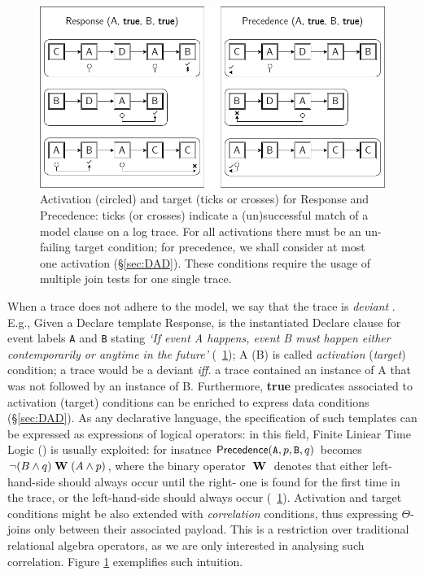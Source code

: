 \begin{figure}
	\centering
	\includegraphics[width=.7\textwidth]{images/ActivationTargetExample.png}
	\caption{Activation (circled) and target (ticks or crosses) for \textsf{Response} and \textsf{Precedence}: ticks (or crosses) indicate a (un)successful match of a model clause on a log trace. For all activations there must be an un-failing target condition; for precedence, we shall consider at most one activation (\S\ref{sec:DAD}). These conditions require the usage of multiple join tests for one single trace.}\label{fig:comparison}
\end{figure}
When a trace does not adhere to the model, we say that the trace is \textit{deviant} \cite{bpm21}. %
E.g., Given a Declare template \textsf{Response},  is the instantiated Declare clause for event labels \texttt{A} and \texttt{B} stating \emph{`If event A happens, event B must happen either contemporarily or anytime in the future'} (\figurename~\ref{fig:comparison}); A (B) is called  \textit{activation} (\textit{target}) condition; a trace would be a deviant \emph{iff.} a trace contained an instance of A that was not followed by an instance of B.  {Furthermore, \textbf{true} predicates associated to activation (target) conditions can be enriched to express data conditions (\S\ref{sec:DAD}). As any declarative language, the specification of such templates can be expressed as expressions of logical operators: in this field, Finite Liniear Time Logic (\LTLf) is usually exploited:} for insatnce $\textsf{Precedence}(\texttt{A},p,\texttt{B},q)$ becomes ${\neg(B\wedge q)}\;\mathbf{W}\;{(A\wedge p)}$, %
{where the binary operator ${}\;\mathbf{W}\;{}$ denotes that either left-hand-side should always occur until the right- one is found for the first time in the trace, or the left-hand-side should always occur (\figurename~\ref{fig:comparison}).}{ Activation and target conditions might be also extended with \textit{correlation} conditions, thus expressing $\Theta$-joins only between their associated payload. This is a restriction over traditional relational algebra operators, as we are only interested in analysing such correlation. Figure \ref{fig:comparison} exemplifies such intuition.}
